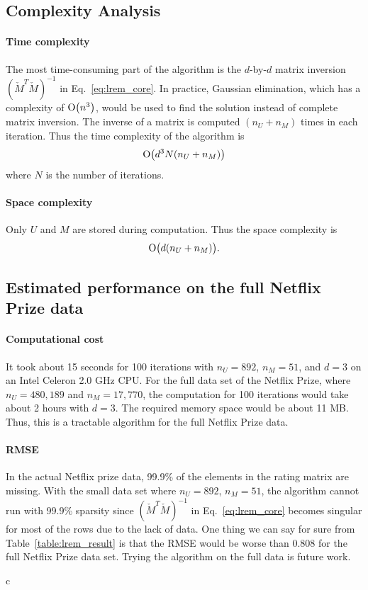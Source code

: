 \documentclass{article}
\begin{document}
\subsection{Complexity Analysis}
\paragraph{Time complexity} 
The most time-consuming part of the algorithm is the $d$-by-$d$ matrix
inversion $(\check{M}^T\check{M})^{-1}$ in Eq.~\ref{eq:lrem_core}. In
practice, Gaussian elimination, which has a complexity of $\operatorname{O}\bigl(n^3\bigr)$,
would be used to find the solution instead of complete matrix
inversion. The inverse of a matrix is computed $(n_U+n_M)$ times in
each iteration. Thus the time complexity of the algorithm is
\begin{equation}
\operatorname{O}\bigl(d^3N(n_U+n_M)\bigr)
\end{equation}
where $N$ is the number of iterations.

\paragraph{Space complexity}
Only $U$ and $M$ are stored during computation. Thus the space complexity is
\begin{equation}
\operatorname{O}\bigl(d(n_U+n_M)\bigr).
\end{equation}

\subsection{Estimated performance on the full Netflix Prize data}
\paragraph{Computational cost}
It took about 15 seconds for 100 iterations with $n_U=892$, $n_M=51$,
and $d=3$ on an Intel Celeron 2.0 GHz CPU. For the full data set of
the Netflix Prize, where $n_U=480,189$ and $n_M=17,770$, the
computation for 100 iterations would take about 2 hours with
$d=3$. The required memory space would be about 11 MB. Thus, this is a
tractable algorithm for the full Netflix Prize data.

\paragraph{RMSE}
In the actual Netflix prize data, 99.9\% of the elements in the rating
matrix are missing. With the small data set where $n_U=892$, $n_M=51$,
the algorithm cannot run with 99.9\% sparsity since
$(\check{M}^T\check{M})^{-1}$ in Eq.~\ref{eq:lrem_core} becomes
singular for most of the rows due to the lack of data. One thing we
can say for sure from Table~\ref{table:lrem_result} is that the RMSE
would be worse than 0.808 for the full Netflix Prize data set. Trying
the algorithm on the full data is future work.



\if c\LaTeXe
\quad
\else
\end{document}
